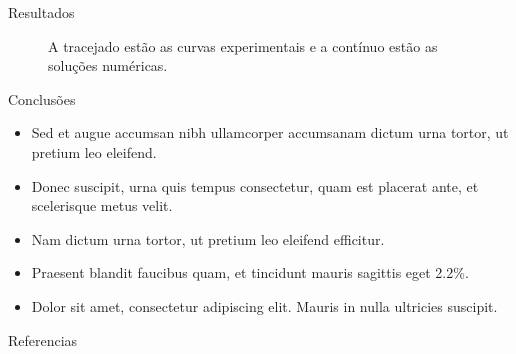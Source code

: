 \documentclass[final]{beamer}
\newlength{\colwidth}
\begin{document}
\begin{frame}[t]
\begin{columns}[t]
\begin{column}{\colwidth}
\begin{block}{Resultados}
\begin{figure}
	\caption{A tracejado estão as curvas experimentais e a contínuo estão as soluções numéricas.}
   \end{figure}
\end{block}

   \begin{exampleblock}{Conclusões}
    \begin{itemize}
      \item Sed et augue accumsan nibh ullamcorper accumsanam dictum urna tortor, ut pretium leo eleifend.  
      \item Donec suscipit, urna quis tempus consectetur, quam est placerat ante, et scelerisque metus velit. 
      \item Nam dictum urna tortor, ut pretium leo eleifend efficitur.
      \item Praesent blandit faucibus quam, et tincidunt mauris sagittis eget 2.2\%.
      \item Dolor sit amet, consectetur adipiscing elit. Mauris in nulla ultricies suscipit.
    \end{itemize}
  \end{exampleblock}


  \begin{block}{Referencias}

    \nocite{*}
    \footnotesize{}

  \end{block}


\end{column}
\end{columns}
\end{frame}
\end{document}
